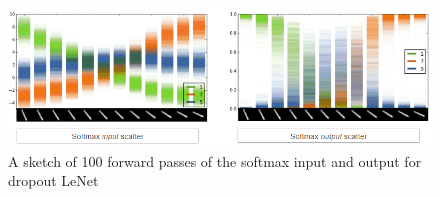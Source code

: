 \begin{figure}[H]
    \centering
    \includegraphics[width=\textwidth]{figs/Classification_multi.png}
    \caption{A sketch of 100 forward passes of the softmax input and output for dropout LeNet}
    \label{fig:classification_multi}
\end{figure}